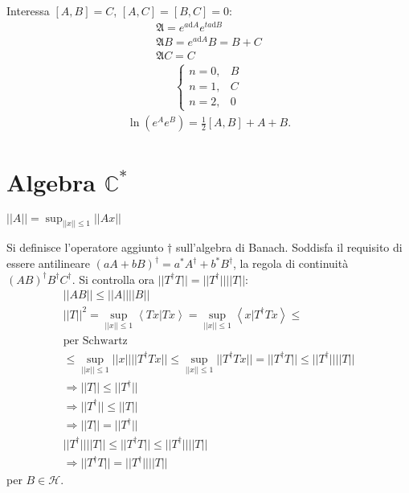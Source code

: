 Interessa $\left[A,B\right]=C$, $\left[A,C\right]=\left[B,C\right]=0$:
\begin{equation}\begin{split}
\mathfrak{A}=e^{a\textrm{d}A}e^{ta\textrm{d}B} \\
\mathfrak{A}B=e^{a\textrm{d}A}B=B+C \\
\mathfrak{A}C=C
\end{split}\end{equation}
\begin{equation}\begin{split}
\begin{cases}
n=0, & B \\
n=1, & C \\
n=2, & 0
\end{cases}
\end{split}\end{equation}
\begin{equation}\begin{split}
\ln{\left(e^Ae^B\right)}=\frac{1}{2}\left[A,B\right]+A+B.
\end{split}\end{equation}

\section{Algebra $\mathbb{C} ^*$} %
$||A||=\sup_{||x||\le 1}{||Ax||}$

Si definisce l'operatore aggiunto $\dag$ sull'algebra di Banach. Soddisfa il requisito di essere antilineare $\left(aA+bB\right)^\dag=a^*A^\dag+b^*B^\dag$, la regola di continuità $\left(AB\right)^\dag B^\dag C^\dag$. Si controlla ora $||T^\dag T||=||T^\dag||||T||$:
\begin{equation}\begin{split}
||AB||\le ||A||||B|| \\
||T||^2=\sup_{||x||\le 1}{\left\langle Tx|Tx \right\rangle}=\sup_{||x||\le 1}{\left\langle x|T^\dag Tx \right\rangle} \le\\
\textrm{per Schwartz} \\
\le \sup_{||x||\le 1}{||x||||T^\dag Tx||}\le \sup_{||x||\le 1}{||T^\dag Tx||}=||T^\dag T||\le ||T^\dag||||T|| \\
\Longrightarrow ||T||\le ||T^\dag|| \\
\Longrightarrow ||T^\dag||\le ||T|| \\
\Longrightarrow ||T||=||T^\dag|| \\
||T^\dag||||T||\le||T^\dag T||\le||T^\dag||||T|| \\
\Longrightarrow ||T^\dag T||=||T^\dag||||T||
\end{split}\end{equation}
per $B\in\mathcal{H}$.


